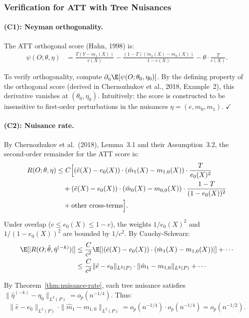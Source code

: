 \subsubsection{Verification for ATT with Tree Nuisances}

\paragraph{(C1): Neyman orthogonality.}
The ATT orthogonal score (Hahn, 1998) is:
\begin{align*}
\psi(O; \theta, \eta)
&= \frac{T(Y - m_1(X))}{e(X)} - \frac{(1-T)(m_1(X) - m_0(X))}{1 - e(X)} - \theta \cdot \frac{T}{e(X)}.
\end{align*}

To verify orthogonality, compute $\partial_\eta \E[\psi(O; \theta_0, \eta_0)]$. By the defining property of the orthogonal score (derived in Chernozhukov et al., 2018, Example~2), this derivative vanishes at $(\theta_0, \eta_0)$. Intuitively: the score is constructed to be insensitive to first-order perturbations in the nuisances $\eta = (e, m_0, m_1)$. $\checkmark$

\paragraph{(C2): Nuisance rate.}
By Chernozhukov et al.\ (2018), Lemma~3.1 and their Assumption~3.2, the second-order remainder for the ATT score is:
\begin{align*}
R(O; \theta, \eta)
&\le C \Bigl[ (\hat{e}(X) - e_0(X)) \cdot (\hat{m}_1(X) - m_{1,0}(X)) \cdot \frac{T}{e_0(X)^2} \\
&\quad + (\hat{e}(X) - e_0(X)) \cdot (\hat{m}_0(X) - m_{0,0}(X)) \cdot \frac{1-T}{(1-e_0(X))^2} \\
&\quad + \text{other cross-terms} \Bigr].
\end{align*}

Under overlap ($c \le e_0(X) \le 1-c$), the weights $1/e_0(X)^2$ and $1/(1-e_0(X))^2$ are bounded by $1/c^2$. By Cauchy-Schwarz:
\begin{align*}
\E[|R(O; \hat\theta, \hat\eta^{(-k)})|]
&\le \frac{C}{c^2} \E[|(\hat{e}(X) - e_0(X)) \cdot (\hat{m}_1(X) - m_{1,0}(X))|] + \cdots \\
&\le \frac{C}{c^2} \|\hat{e} - e_0\|_{L^2(P)} \cdot \|\hat{m}_1 - m_{1,0}\|_{L^2(P)} + \cdots
\end{align*}

By Theorem~\ref{thm:nuisance-rate}, each tree nuisance satisfies $\|\hat{\eta}^{(-k)} - \eta_0\|_{L^2(P)} = o_p(n^{-1/4})$. Thus:
\[
\|\hat{e} - e_0\|_{L^2(P)} \cdot \|\hat{m}_1 - m_{1,0}\|_{L^2(P)} = o_p(n^{-1/4}) \cdot o_p(n^{-1/4}) = o_p(n^{-1/2}).
\]

